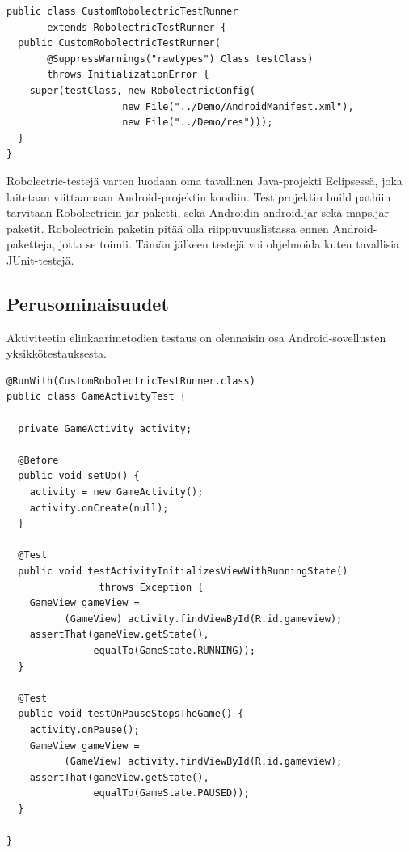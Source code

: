 \begin{lstlisting}[float,label=robolectric_runner,caption=CustomRobolectricTestRunner]
public class CustomRobolectricTestRunner 
       extends RobolectricTestRunner {
  public CustomRobolectricTestRunner(
       @SuppressWarnings("rawtypes") Class testClass)
       throws InitializationError {
  	super(testClass, new RobolectricConfig(
                    new File("../Demo/AndroidManifest.xml"), 
                    new File("../Demo/res")));
  }
}
\end{lstlisting}

Robolectric-testejä varten luodaan oma tavallinen Java-projekti Eclipsessä, joka laitetaan viittaamaan Android-projektin koodiin. Testiprojektin build pathiin tarvitaan Robolectricin jar-paketti, sekä Androidin android.jar sekä maps.jar -paketit. Robolectricin paketin pitää olla riippuvuuslistassa ennen Android-paketteja, jotta se toimii. Tämän jälkeen testejä voi ohjelmoida kuten tavallisia JUnit-testejä.

\subsection{Perusominaisuudet}
\label{basic_unittests}

Aktiviteetin elinkaarimetodien testaus on olennaisin osa Android-sovellusten yksikkötestauksesta. 

\begin{lstlisting}[float,label=robolectric_activitytest,caption=Yksinkertainen aktiviteettiyksikkötesti Robolectricilla]
@RunWith(CustomRobolectricTestRunner.class)
public class GameActivityTest {

  private GameActivity activity;

  @Before
  public void setUp() {
    activity = new GameActivity();
    activity.onCreate(null);
  }

  @Test
  public void testActivityInitializesViewWithRunningState() 
                throws Exception {
    GameView gameView = 
          (GameView) activity.findViewById(R.id.gameview);
    assertThat(gameView.getState(), 
               equalTo(GameState.RUNNING));
  }
  
  @Test
  public void testOnPauseStopsTheGame() {
  	activity.onPause();
  	GameView gameView = 
  	      (GameView) activity.findViewById(R.id.gameview);
  	assertThat(gameView.getState(), 
  	           equalTo(GameState.PAUSED));
  }
  
}
\end{lstlisting}

